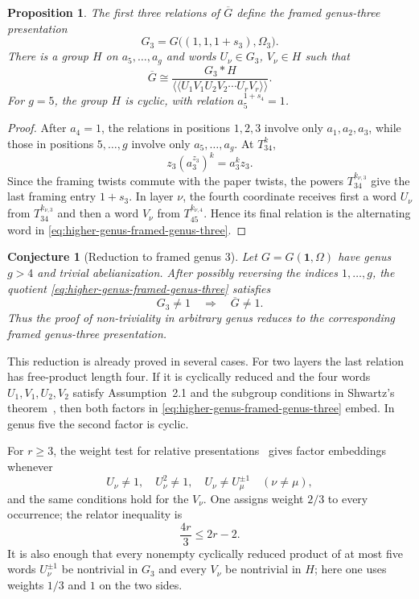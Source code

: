 \documentclass{article}
\newtheorem{conjecture}[theorem]{Conjecture}
\newtheorem{prop}[theorem]{Proposition}
\begin{document}
\begin{prop}\label{prop:cut-at-a4}
The first three relations of $\overline G$ define the framed genus-three
presentation
\begin{equation}
 G_3=G\bigl((1,1,1+s_3),\Omega_3\bigr).
 \label{eq:framed-genus-three-factor}
\end{equation}
There is a group $H$ on $a_5,\ldots,a_g$ and words
$U_\nu\in G_3$, $V_\nu\in H$ such that
\begin{equation}
 \overline G\cong
 \frac{G_3*H}
 {\langle\!\langle U_1V_1U_2V_2\cdots U_rV_r\rangle\!\rangle}.
 \label{eq:higher-genus-framed-genus-three}
\end{equation}
For $g=5$, the group $H$ is cyclic, with relation
$a_5^{1+s_4}=1$.
\end{prop}

\begin{proof}
After $a_4=1$, the relations in positions $1,2,3$ involve only
$a_1,a_2,a_3$, while those in positions $5,\ldots,g$ involve only
$a_5,\ldots,a_g$.  At $T_{34}^{k}$,
\[
 z_3(a_3^{z_3})^k=a_3^kz_3.
\]
Since the framing twists commute with the paper twists, the powers
$T_{34}^{k_{\nu,3}}$ give the last framing entry $1+s_3$.
In layer $\nu$, the fourth coordinate receives first a word $U_\nu$ from
$T_{34}^{k_{\nu,3}}$ and then a word $V_\nu$ from
$T_{45}^{k_{\nu,4}}$.  Hence its final relation is the alternating word in
\eqref{eq:higher-genus-framed-genus-three}.
\end{proof}

\begin{conjecture}[Reduction to framed genus $3$]
\label{conj:reduction-to-framed-genus-three}
Let $G=G(\mathbf 1,\Omega)$ have genus $g>4$ and trivial abelianization.
After possibly reversing the indices $1,\ldots,g$, the quotient
\eqref{eq:higher-genus-framed-genus-three} satisfies
\[
 G_3\neq1\quad\Longrightarrow\quad\overline G\neq1.
\]
Thus the proof of non-triviality in arbitrary genus reduces to the
corresponding framed genus-three presentation.
\end{conjecture}

This reduction is already proved in several cases.  For two layers the last
relation has free-product length four.  If it is cyclically reduced and the
four words $U_1,V_1,U_2,V_2$ satisfy Assumption~2.1 and the subgroup
conditions in Shwartz's theorem~\cite{Sh}, then both factors in
\eqref{eq:higher-genus-framed-genus-three} embed.  In genus five the second
factor is cyclic.

For $r\geq3$, the weight test for relative presentations~\cite{BP} gives
factor embeddings whenever
\[
 U_\nu\neq1,
 \quad U_\nu^2\neq1,
 \quad U_\nu\neq U_\mu^{\pm1}\quad(\nu\neq\mu),
\]
and the same conditions hold for the $V_\nu$.  One assigns weight $2/3$ to
every occurrence; the relator inequality is
\[
 \frac{4r}{3}\leq2r-2.
\]
It is also enough that every nonempty cyclically reduced product of at most
five words $U_\nu^{\pm1}$ be nontrivial in $G_3$ and every $V_\nu$ be
nontrivial in $H$; here one uses weights $1/3$ and $1$ on the two sides.
\end{document}
